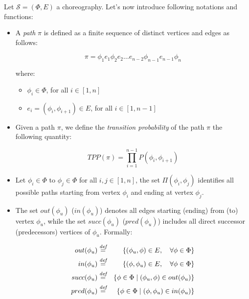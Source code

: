Let $\mathcal{S} = (\Phi,E)$ a choreography. Let's now introduce following notations and functions:

\begin{itemize}
	\item A \textit{path} $\pi$ is defined as a finite sequence of distinct vertices and edges as follows:
	
	\begin{equation}
	\pi = \phi_1 e_1 \phi_2 e_2 \ldots e_{n-2}\phi_{n-1} e_{n-1} \phi_n
	\end{equation}
	 
	where:
	
	\begin{itemize}
		\item $\phi_i \in \Phi$, for all $i \in \left[ 1, n \right]$
		\item $e_i = \left( \phi_i, \phi_{i+1} \right) \in E$, for all $i \in \left[ 1, n-1 \right]$
	\end{itemize}
	
	\item Given a path $\pi$, we define the \textit{transition probability} of the path $\pi$ the following quantity:
	
	\begin{equation}
		TPP(\pi) = \prod_{i = 1}^{n-1} P\left(\phi_i, \phi_{i+1} \right)
	\end{equation}

	\item Let $\phi_i \in \Phi$ to $\phi_j \in \Phi$ for all $i,j \in \left[ 1, n \right]$, the set $\Pi(\phi_i, \phi_j)$ identifies all possible paths starting from vertex $\phi_i$ and ending at vertex $\phi_j$.
	
	\item The set $out(\phi_u)$ ($in(\phi_u)$) denotes all edges starting (ending) from (to) vertex $\phi_u$, while the set $succ(\phi_u)$ ($pred(\phi_u)$) includes all direct successor (predecessors) vertices of $\phi_u$. Formally:
	
	\begin{eqnarray}\label{outDef}
		out(\phi_u) & \overset{\textit{def}}{=} & \left\lbrace (\phi_u, \phi) \in E, \quad \forall \phi \in \Phi  \right\rbrace \\
		in(\phi_u) & \overset{\textit{def}}{=} & \left\lbrace (\phi, \phi_u) \in E, \quad \forall \phi \in \Phi  \right\rbrace \\
		succ(\phi_u) & \overset{\textit{def}}{=} & \left\lbrace \phi \in \Phi \mid (\phi_u, \phi) \in out(\phi_u)  \right\rbrace \\
		pred(\phi_u) & \overset{\textit{def}}{=} & \left\lbrace \phi \in \Phi \mid (\phi, \phi_u) \in in(\phi_u)  \right\rbrace 
	\end{eqnarray}
	

\end{itemize}
